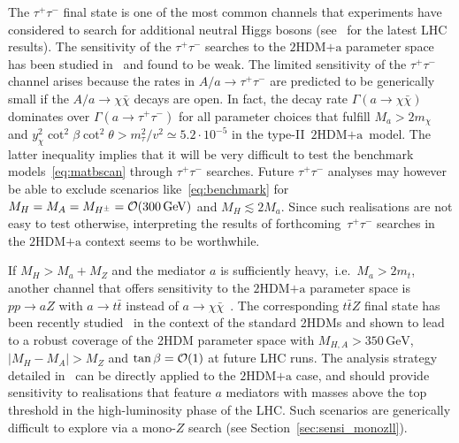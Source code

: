\documentclass[review]{elsarticle}
\newcommand{\mA}{\ensuremath{M_{A}}\xspace}
\newcommand{\ma}{\ensuremath{M_{a}}\xspace}
\newcommand{\mH}{\ensuremath{M_{H}}\xspace}
\newcommand{\mHc}{\ensuremath{M_{H^{\pm}}}\xspace}
\newcommand{\hdma}{\ensuremath{\textrm{2HDM+a}}\xspace}
\begin{document}
The $\tau^+ \tau^-$ final state is one of the most common channels that experiments have considered to search for additional neutral Higgs bosons (see~\cite{Aaboud:2017sjh,Sirunyan:2018zut} for the latest LHC results).   The sensitivity of the $\tau^+ \tau^-$ searches to the \hdma parameter space has been studied in~\cite{Bauer:2017ota} and found to be weak. The limited sensitivity of the $\tau^+ \tau^-$ channel arises because the rates in  $A/a \to \tau^+ \tau^-$  are predicted to be generically small if the $A/a \to \chi \bar \chi$ decays are open. In fact, the decay rate $\Gamma ( a \to \chi \bar \chi )$ dominates over  $\Gamma ( a \to \tau^+ \tau^- )$ for all parameter choices that fulfill $M_a > 2 m_\chi$ and  $y_\chi^2  \cot^2 \beta \cot^2 \theta > m_\tau^2/v^2 \simeq 5.2 \cdot 10^{-5}$ in the type-II~\hdma~model. The latter inequality implies that it will be very difficult to test the benchmark models~\eqref{eq:matbscan} through  $\tau^+ \tau^-$ searches. Future  $\tau^+ \tau^-$ analyses may however be able to exclude scenarios like~\eqref{eq:benchmark} for $\mH = \mA = \mHc = {\cal O} (300 \, {\mathrm{GeV}})$ and $M_H \lesssim 2M_a$. Since such realisations are not easy to test otherwise, interpreting the results of forthcoming~$\tau^+ \tau^-$ searches in the \hdma context seems to be worthwhile.

If $\mH > \ma + M_Z$ and the mediator $a$ is sufficiently heavy,~i.e.~$\ma > 2 m_t$, another channel that offers sensitivity to the  $\hdma$ parameter space is $pp \to aZ$ with $a \to t \bar t$ instead of $a \to \chi \bar \chi$~\cite{GPHeidelberg}. The corresponding $t \bar t Z$ final state has been recently studied~\cite{Haisch:2018djm} in the context of the standard 2HDMs and shown to lead to a robust coverage of the 2HDM parameter space with $M_{H,A} > 350 \, {\mathrm{GeV}}$, $|M_H - M_A| > M_Z$ and $\tan \beta = {\cal O} (1)$ at future LHC runs.  The analysis strategy detailed in~\cite{Haisch:2018djm} can be directly applied to the \hdma case, and should provide sensitivity to realisations that feature $a$ mediators with masses above the top threshold in the high-luminosity phase of the LHC. Such scenarios are generically difficult to explore via a mono-$Z$ search (see Section~\ref{sec:sensi_monozll}).
\end{document}
